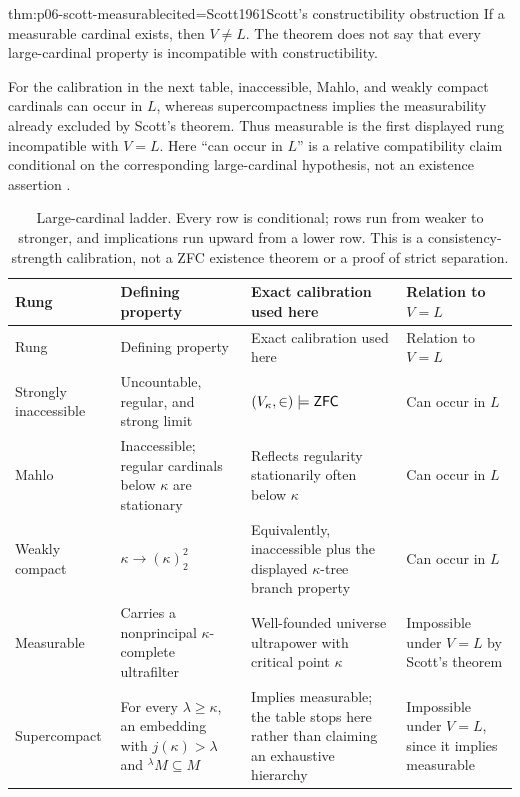 \begin{hbtheorem}{thm:p06-scott-measurable}{cited=Scott1961}{Scott's constructibility obstruction}
If a measurable cardinal exists, then \(V\ne L\).  The theorem does not say
that every large-cardinal property is incompatible with constructibility.
\end{hbtheorem}

For the calibration in the next table, inaccessible, Mahlo, and weakly
compact cardinals can occur in \(L\), whereas supercompactness implies the
measurability already excluded by Scott's theorem.  Thus measurable is the
first displayed rung incompatible with \(V=L\).  Here ``can occur in \(L\)''
is a relative compatibility claim conditional on the corresponding
large-cardinal hypothesis, not an existence assertion \cite{Kanamori2003}.

\begingroup\scriptsize
\begin{longtable}{@{}p{}p{}p{}p{}@{}}
\caption{Large-cardinal ladder.  Every row is conditional;
rows run from weaker to stronger, and implications run upward from a lower
row.  This is a consistency-strength calibration, not a ZFC existence theorem
or a proof of strict separation.}
\label{tab:p06-large-cardinal-ladder}\\
\toprule
Rung & Defining property & Exact calibration used here & Relation to \(V=L\) \\
\midrule
\endfirsthead
\toprule
Rung & Defining property & Exact calibration used here & Relation to \(V=L\) \\
\midrule
\endhead
Strongly inaccessible & Uncountable, regular, and strong limit &
\((V_\kappa,\in)\models\mathsf{ZFC}\) & Can occur in \(L\) \\
Mahlo & Inaccessible; regular cardinals below \(\kappa\) are stationary &
Reflects regularity stationarily often below \(\kappa\) & Can occur in \(L\) \\
Weakly compact & \(\kappa\longrightarrow(\kappa)^2_2\) & Equivalently,
inaccessible plus the displayed \(\kappa\)-tree branch property & Can occur in
\(L\) \\
Measurable & Carries a nonprincipal \(\kappa\)-complete ultrafilter &
Well-founded universe ultrapower with critical point \(\kappa\) & Impossible
under \(V=L\) by Scott's theorem \\
Supercompact & For every \(\lambda\geq\kappa\), an embedding with
\(j(\kappa)>\lambda\) and \({}^{\lambda}M\subseteq M\) & Implies measurable;
the table stops here rather than claiming an exhaustive hierarchy & Impossible
under \(V=L\), since it implies measurable \\
\bottomrule
\end{longtable}
\endgroup


